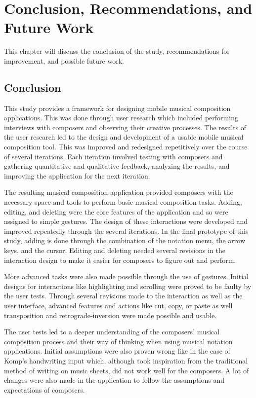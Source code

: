 
\chapter{Conclusion, Recommendations, and Future Work}

	This chapter will discuss the conclusion of the study, recommendations for improvement, and possible future work.

	\section{Conclusion}

		This study provides a framework for designing mobile musical composition applications. This was done through user research which included performing interviews with composers and observing their creative processes. The results of the user research led to the design and development of a usable mobile musical composition tool. This was improved and redesigned repetitively over the course of several iterations. Each iteration involved testing with composers and gathering quantitative and qualitative feedback, analyzing the results, and improving the application for the next iteration. 

		The resulting musical composition application provided composers with the necessary space and tools to perform basic musical composition tasks. Adding, editing, and deleting were the core features of the application and so were assigned to simple gestures. The design of these interactions were developed and improved repeatedly through the several iterations. In the final prototype of this study, adding is done through the combination of the notation menu, the arrow keys, and the cursor. Editing and deleting needed several revisions in the interaction design to make it easier for composers to figure out and perform. 

		More advanced tasks were also made possible through the use of gestures. Initial designs for interactions like highlighting and scrolling were proved to be faulty by the user tests. Through several revisions made to the interaction as well as the user interface, advanced features and actions like cut, copy, or paste as well transposition and retrograde-inversion were made possible and usable. 

		The user tests led to a deeper understanding of the composers' musical composition process and their way of thinking when using musical notation applications. Initial assumptions were also proven wrong like in the case of Komp's handwriting input which, although took inspiration from the traditional method of writing on music sheets, did not work well for the composers. A lot of changes were also made in the application to follow the assumptions and expectations of composers. 

